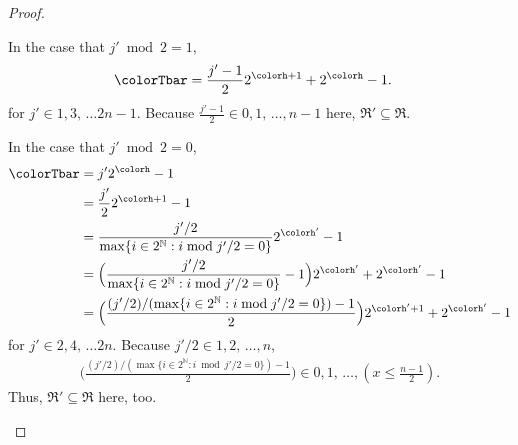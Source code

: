 \begin{proof}
\begin{proofpart}
In the case that $j' \bmod 2 = 1$,
\begin{align*}
\colorTbar
&= \frac{j'-1}{2} 2^{\colorh + 1} + 2^{\colorh} - 1.
\end{align*}
for $j' \in 1, 3, \,\ldots 2n-1$.
Because $\frac{j'-1}{2} \in 0, 1, \, \ldots, n - 1$ here, $\mathfrak{R}' \subseteq \mathfrak{R}$.

In the case that $j' \bmod 2 = 0$,
\begin{align*}
\colorTbar
&= j'2^{\colorh} - 1\\
&= \frac{j'}{2}2^{\colorh + 1} - 1\\
&= \frac{j'/2}{\max\{ i \in 2^{\mathbb{N}} : i \bmod j'/2 = 0 \}}2^{\colorh'} - 1\\
&= \Big(\frac{j'/2}{\max\{ i \in 2^{\mathbb{N}} : i \bmod j'/2 = 0 \}} - 1\Big) 2^{\colorh'} + 2^{\colorh'} - 1\\
&= \Big(\frac{(j'/2)/(\max\{ i \in 2^{\mathbb{N}} : i \bmod j'/2 = 0 \}) - 1}{2}\Big) 2^{\colorh' + 1} + 2^{\colorh'} - 1\\
\end{align*}
for $j' \in 2, 4, \,\ldots 2n$.
Because $j'/2 \in 1, 2, \, \ldots, n$,
\begin{align*}
\Big(\frac{(j'/2)/(\max\{ i \in 2^{\mathbb{N}} : i \bmod j'/2 = 0 \}) - 1}{2}\Big)
\in 0,1, \, \ldots, (x \leq \frac{n - 1}{2}).
\end{align*}
Thus,  $\mathfrak{R}' \subseteq \mathfrak{R}$ here, too.
\end{proofpart}
\end{proof}

